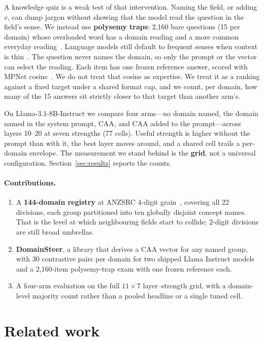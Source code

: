 \documentclass{article} %
\begin{document}
A knowledge quiz is a weak test of that intervention.
Naming the field, or adding $v$, can dump jargon without showing that the model read the question in the field's sense.
We instead use \textbf{polysemy traps}: 2{,}160 bare questions (15 per domain) whose overloaded word has a domain reading and a more common everyday reading~\citep{rodd2002ambiguity}.
Language models still default to frequent senses when context is thin~\citep{meconi2025wsd,campolungo2022mwt}.
The question never names the domain, so only the prompt or the vector can select the reading.
Each item has one frozen reference answer, scored with MPNet cosine~\citep{song2020mpnet,reimers2019sbert}.
We do not treat that cosine as expertise.
We treat it as a ranking against a fixed target under a shared format cap, and we count, per domain, how many of the 15 answers sit strictly closer to that target than another arm's.

On Llama-3.1-8B-Instruct we compare four arms---no domain named, the domain named in the system prompt, CAA, and CAA added to the prompt---across layers 10--20 at seven strengths (77 cells).
Useful strength is higher without the prompt than with it, the best layer moves around, and a shared cell trails a per-domain envelope.
The measurement we stand behind is the \textbf{grid}, not a universal configuration.
Section~\ref{sec:results} reports the counts.

\paragraph{Contributions.}
\begin{enumerate}
\item A \textbf{144-domain registry} at ANZSRC 4-digit grain~\citep{anzsrc2020}, covering all 22 divisions, each group partitioned into ten globally disjoint concept names.
That is the level at which neighbouring fields start to collide; 2-digit divisions are still broad umbrellas.
\item \textbf{DomainSteer}, a library that derives a CAA vector for any named group, with 30 contrastive pairs per domain for two shipped Llama Instruct models and a 2{,}160-item polysemy-trap exam with one frozen reference each.
\item A four-arm evaluation on the full $11\times 7$ layer--strength grid, with a domain-level majority count rather than a pooled headline or a single tuned cell.
\end{enumerate}

\section{Related work}
\end{document}
